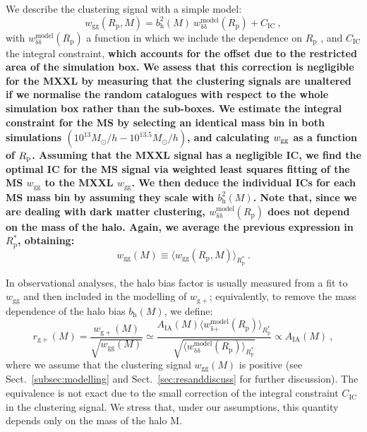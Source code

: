\documentclass[a4paper,fleqn,usenatbib]{mnras}
\newenvironment{correction}
 {\bfseries}%
  {}%
\begin{document}
We describe the clustering signal with a simple model:
\begin{equation}
    w_{\mathrm{gg}} (R_{\mathrm{p}}, M)=b_\mathrm{h}^2 (M)\ w_{\mathrm{\delta} \mathrm{\delta}}^{\mathrm{model}} (R_{\mathrm{p}}) + C_{\mathrm{IC}} \ , 
	\label{eq:wgg}
\end{equation}
with $w_{\mathrm{\delta} \mathrm{\delta}}^{\mathrm{model}} (R_{\mathrm{p}})$ a function in which we include the dependence on $R_{\mathrm{p}}$ \citep[equation 9]{vanUitertJoachimi2017}, and $C_{\mathrm{IC}}$ the integral constraint, \begin{correction}which accounts for the offset due to the restricted area of the simulation box. We assess that this correction is negligible for the MXXL by measuring that the clustering signals are unaltered if we normalise the random catalogues with respect to the whole simulation box rather than the sub-boxes. We estimate the integral constraint for the MS by selecting an identical mass bin in both simulations $(10^{13} M_{\odot}/h - 10^{13.5} M_{\odot}/h)$, and calculating $w_{\rm{gg}}$ as a function of $R_{\rm{p}}$. Assuming that the MXXL signal has a negligible IC, we find the optimal IC for the MS signal via weighted least squares fitting of the MS $w_\mathrm{gg}$ to the MXXL $w_\mathrm{gg}$. We then deduce the individual ICs for each MS mass bin by assuming they scale with $b_\mathrm{h}^2(M)$.\end{correction} Note that, since we are dealing with dark matter clustering, $w_{\mathrm{\delta} \mathrm{\delta}}^{\mathrm{model}} (R_{\mathrm{p}})$ does not depend on the mass of the halo. Again, we average the previous expression in $R_{\mathrm{p}}^*$, obtaining:
\begin{equation}
    w_{\mathrm{gg}} (M) \equiv \langle w_{\mathrm{gg}} (R_{\mathrm{p}}, M) \rangle _{R_{\mathrm{p}}^*} \ .
	\label{eq:wgpmass}
\end{equation}

In observational analyses, the halo bias factor is usually measured from a fit to $w_{\mathrm{gg}}$ and then included in the modelling of $w_{\mathrm{g+}}$; equivalently, to remove the mass dependence of the halo bias $b_{\mathrm{h}} (M)$, we define:
\begin{equation}
    r_{\mathrm{g+}} (M)=\frac{w_{\mathrm{g+}} (M)}{\sqrt{w_{\mathrm{gg}} (M)}} \simeq \frac{A_{\mathrm{IA}} (M) \langle w_{\mathrm{\delta} \mathrm{+}}^{\mathrm{model}} (R_{\mathrm{p}}) \rangle _{ R_{\mathrm{p}}^*} }{\sqrt{\langle w_{\mathrm{\delta} \mathrm{\delta}}^{\mathrm{model}} (R_{\mathrm{p}})\rangle _{R_{\mathrm{p}}^*}}} \propto A_{\mathrm{IA}} (M) \ ,
	\label{eq:rg+}
\end{equation}
where we assume that the clustering signal $w_{\mathrm{gg}}(M)$ is positive (see Sect.~\ref{subsec:modelling} and Sect.~\ref{sec:resanddiscuss} for further discussion). The equivalence is not exact due to the small correction of the integral constraint $C_{\mathrm{IC}}$ in the clustering signal. We stress that, under our assumptions, this quantity depends only on the mass of the halo M.
\end{document}
